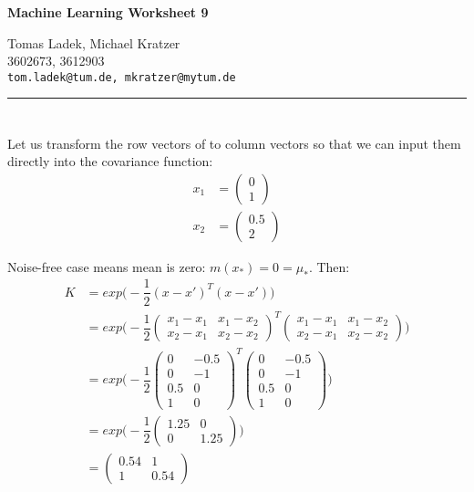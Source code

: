 \documentclass[11pt]{article}
\makeatletter
\newcommand{\exercise}{\section{}}
\newcommand{\hwhead}[4]{
\begin{center}
\sffamily\large\bfseries Machine Learning Worksheet #1
\vspace{2mm}
\normalfont

#2\\
#3\\
\texttt{#4}
\end{center}
\vspace{6mm} \hrule \vspace{4mm}
}
\newcommand{\names}{Tomas Ladek, Michael Kratzer} %
\newcommand{\imats}{3602673, 3612903} %
\newcommand{\emails}{tom.ladek@tum.de, mkratzer@mytum.de} %
\makeatother
\begin{document}
\hwhead{9}{\names}{\imats}{\emails}


\exercise
Let us transform the row vectors of  to column vectors so that we can input them directly into the covariance function:
\begin{align*}
	x_1 &= 
	\begin{pmatrix}
	0 \\
	1
	\end{pmatrix}\\
	x_2 &=
	\begin{pmatrix}
	0.5 \\
	2
	\end{pmatrix}
\end{align*}


\noindent Noise-free case means mean is zero: $m(x_*) = 0 = \mu_*$. Then:
\begin{align*}
	K &= exp\big(-\dfrac{1}{2}(x - x')^T (x - x')\big)\\	
	  &= exp\big(-\dfrac{1}{2}
	  \begin{pmatrix}
		  x_1 - x_1 & x_1 - x_2 \\
		  x_2 - x_1 & x_2 - x_2
	  \end{pmatrix}^T 
	  \begin{pmatrix}
		  x_1 - x_1 & x_1 - x_2 \\
		  x_2 - x_1 & x_2 - x_2
	  \end{pmatrix}
	  \big)\\	  
	  &= exp\big(-\dfrac{1}{2}
	  \begin{pmatrix}
		  0 & -0.5 \\
		  0 & -1 \\
		  0.5 & 0 \\
		  1 & 0
	  \end{pmatrix}^T 
	  \begin{pmatrix}
		  0 & -0.5 \\
		  0 & -1 \\
		  0.5 & 0 \\
		  1 & 0
	  \end{pmatrix}
	  \big)\\	  
	  &= exp\big(-\dfrac{1}{2}
	  \begin{pmatrix}
		  1.25 & 0 \\
		  0 & 1.25
	  \end{pmatrix}
	  \big)\\	  
	  &=
	  \begin{pmatrix}
		  0.54 & 1 \\
		  1 & 0.54		  
	  \end{pmatrix}
\end{align*}
\end{document}
